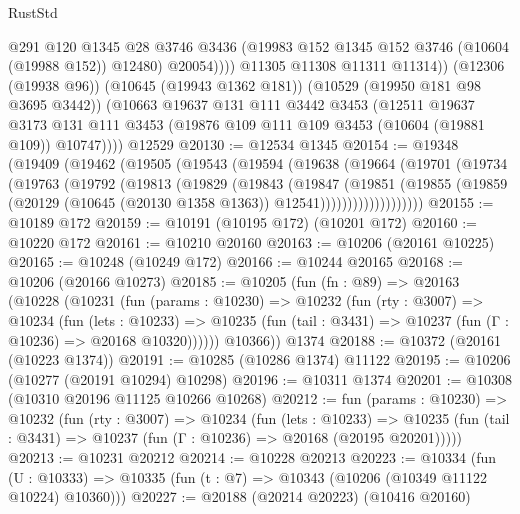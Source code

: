 \begin{lexlean}{RustStd}
\begin{coremodule}
                  @291
                  @120
                  @1345
                  @28
                  @3746
                  @3436
                  (@19983 @152 @1345 @152 @3746 (@10604 (@19988 @152)) @12480)
                  @20054))))
          @11305
          @11308
          @11311
          @11314))
      (@12306 (@19938 @96))
      (@10645 (@19943 @1362 @181))
      (@10529 (@19950 @181 @98 @3695 @3442))
      (@10663
        @19637
        @131
        @111
        @3442
        @3453
        (@12511
          @19637
          @3173
          @131
          @111
          @3453
          (@19876 @109 @111 @109 @3453 (@10604 (@19881 @109)) @10747))))
    @12529
@20130 := @12534 @1345
@20154 := @19348
    (@19409
      (@19462
        (@19505
          (@19543
            (@19594
              (@19638
                (@19664
                  (@19701
                    (@19734
                      (@19763
                        (@19792
                          (@19813
                            (@19829
                              (@19843
                                (@19847
                                  (@19851
                                    (@19855
                                      (@19859
                                        (@20129
                                          (@10645 (@20130 @1358 @1363))
                                          @12541)))))))))))))))))))
@20155 := @10189 @172
@20159 := @10191 (@10195 @172) (@10201 @172)
@20160 := @10220 @172
@20161 := @10210 @20160
@20163 := @10206 (@20161 @10225)
@20165 := @10248 (@10249 @172)
@20166 := @10244 @20165
@20168 := @10206 (@20166 @10273)
@20185 := @10205
    (fun (fn : @89) =>
    @20163
      (@10228
        (@10231
          (fun (params : @10230) =>
          @10232
            (fun (rty : @3007) =>
            @10234
              (fun (lets : @10233) =>
              @10235 (fun (tail : @3431) => @10237 (fun (Γ : @10236) => @20168 @10320))))))
        @10366))
    @1374
@20188 := @10372 (@20161 (@10223 @1374))
@20191 := @10285 (@10286 @1374) @11122
@20195 := @10206 (@10277 (@20191 @10294) @10298)
@20196 := @10311 @1374
@20201 := @10308 (@10310 @20196 @11125 @10266 @10268)
@20212 := fun (params : @10230) =>
  @10232
    (fun (rty : @3007) =>
    @10234
      (fun (lets : @10233) =>
      @10235 (fun (tail : @3431) => @10237 (fun (Γ : @10236) => @20168 (@20195 @20201)))))
@20213 := @10231 @20212
@20214 := @10228 @20213
@20223 := @10334
    (fun (U : @10333) => @10335 (fun (t : @7) => @10343 (@10206 (@10349 @11122 @10224) @10360)))
@20227 := @20188 (@20214 @20223) (@10416 @20160)

\end{coremodule}
\end{lexlean}
